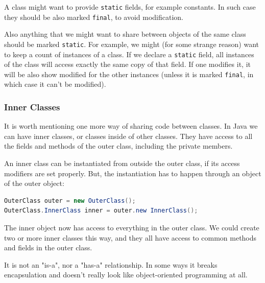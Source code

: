 A class might want to provide \texttt{static} fields, for example constants. In such case they should be also marked \texttt{final}, to avoid modification.

Also anything that we might want to share between objects of the same class should be marked \texttt{static}. For example, we might (for some strange reason) want to keep a count of instances of a class. If we declare a \texttt{static} field, all instances of the class will access exactly the same copy of that field. If one modifies it, it will be also show modified for the other instances (unless it is marked \texttt{final}, in which case it can't be modified).

\subsubsection{Inner Classes}
It is worth mentioning one more way of sharing code between classes. In Java we can have inner classes, or classes inside of other classes. They have access to all the fields and methods of the outer class, including the private members.

An inner class can be instantiated from outside the outer class, if its access modifiers are set properly. But, the instantiation has to happen through an object of the outer object:
\begin{lstlisting}[language=Java]
OuterClass outer = new OuterClass();
OuterClass.InnerClass inner = outer.new InnerClass();
\end{lstlisting}

The inner object now has access to everything in the outer class. We could create two or more inner classes this way, and they all have access to common methods and fields in the outer class. 

It is not an "is-a", nor a "has-a" relationship. In some ways it breaks encapsulation and doesn't really look like object-oriented programming at all.